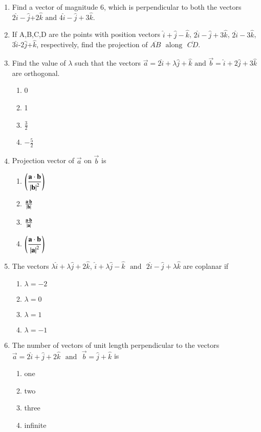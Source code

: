 \begin{enumerate}[label=\thesubsection.\arabic*,ref=\thesubsection.\theenumi]
\item Find a vector of magnitude 6, which is perpendicular to both the vectors $2\hat{i}-\hat{j}$+$2\hat{k}\text{ and }4\hat{i}-\hat{j}+3\hat{k}$.
\item If A,B,C,D  are the points with position vectors $\hat{i}+\hat{j}-\hat{k}$, $2\hat{i}-\hat{j}+3\hat{k}$, $2\hat{i}-3\hat{k}$, $3\hat{i}$-$2\hat{j}$+$\hat{k}$, respectively, find the projection of $\overline{AB}$ $\text{ along }$ $\overline{CD}$.
\item Find the value of $\lambda$ such that the vectors $\vec{a}=2\hat{i}+\lambda\hat{j}+\hat{k}$ $\text{and}$ $\vec{b}=\hat{i}+2\hat{j}+3\hat{k}$ are orthogonal.
	\begin{enumerate}
\item 0
\item 1 
\item $\frac{3}{2}$
\item $-\frac{5}{2}$
	\end{enumerate}
\item Projection vector of $\vec{a}$ on $\vec{b}$ is
	\begin{enumerate}
\item $\left(\dfrac{\mathbf{a}\cdot\mathbf{b}}{\left\vert\mathbf{b}\right\vert^2}\right)$
\item $\frac{\mathbf{a}\cdot\mathbf{b}}{\left\vert\mathbf{b}\right\vert}$
\item $\frac{\mathbf{a}\cdot\mathbf{b}}{\left\vert\mathbf{a}\right\vert}$
\item $\left(\dfrac{\mathbf{a}\cdot\mathbf{b}}{\left\vert\mathbf{a}\right\vert^2}\right)$
\end{enumerate}
\item The vectors $\lambda\hat{i}+\lambda\hat{j}+2\hat{k}$, $\hat{i}+\lambda\hat{j}-\hat{k}$ $\text{ and }$ $2\hat{i}-\hat{j}+\lambda\hat{k}$ are coplanar if
	\begin{enumerate}
\item	$\lambda=-2$
\item $\lambda=0$
\item $\lambda=1$
\item	$\lambda=-1$
\end{enumerate}
\item The number of vectors of unit length perpendicular to the vectors $\vec{a}=2\hat{i}+\hat{j}+2\hat{k}$ $\text{ and }$ $\vec{b}=\hat{j}+\hat{k}$ is
	\begin{enumerate}
\item one
\item  two
\item three
\item infinite

\end{enumerate}
\end{enumerate}
